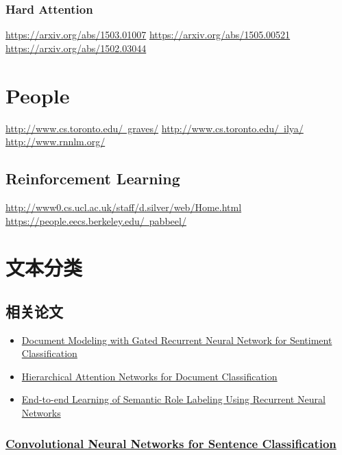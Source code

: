 \documentclass[10pt,a4paper]{ctexbook}
\begin{document}
\subsubsection{Hard Attention}
\href{Inferring Algorithmic Patterns with Stack-Augmented Recurrent Nets}{https://arxiv.org/abs/1503.01007}
\href{Reinforcement Learning Neural Turing Machines - Revised}{https://arxiv.org/abs/1505.00521}
\href{Show, Attend and Tell: Neural Image Caption Generation with Visual Attention}{https://arxiv.org/abs/1502.03044}

\section{People}
\href{Alex Graves}{http://www.cs.toronto.edu/~graves/}
\href{Ilya Sutskever}{http://www.cs.toronto.edu/~ilya/}
\href{Tomas Mikolov}{http://www.rnnlm.org/}

\subsection{Reinforcement Learning}
\href{David Silver}{http://www0.cs.ucl.ac.uk/staff/d.silver/web/Home.html}
\href{Pieter Abbeel}{https://people.eecs.berkeley.edu/~pabbeel/}


\section{文本分类}
\subsection{相关论文}

\begin{itemize}
\item \href{http://www.aclweb.org/old_anthology/D/D15/D15-1167.pdf}{Document Modeling with Gated Recurrent Neural Network for Sentiment Classification}
\item \href{http://www.aclweb.org/anthology/N16-1174}{Hierarchical Attention Networks for Document Classification}
\item \href{http://www.aclweb.org/anthology/P15-1109}{End-to-end Learning of Semantic Role Labeling Using Recurrent Neural Networks}
\end{itemize}

\subsubsection{\href{https://arxiv.org/abs/1408.5882}{Convolutional Neural Networks for Sentence Classification}}
\end{document}
